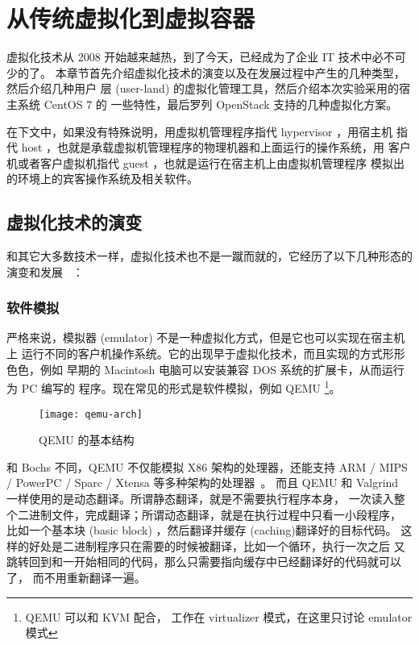 \chapter{从传统虚拟化到虚拟容器}
\label{cha:virtualization-and-container}

虚拟化技术从 2008 开始越来越热，到了今天，已经成为了企业 IT 技术中必不可少的了。
本章节首先介绍虚拟化技术的演变以及在发展过程中产生的几种类型，然后介绍几种用户
层 (user-land) 的虚拟化管理工具，然后介绍本次实验采用的宿主系统 CentOS 7 的
一些特性，最后罗列 OpenStack 支持的几种虚拟化方案。

在下文中，如果没有特殊说明，用虚拟机管理程序指代 hypervisor ，用宿主机
指代 host ，也就是承载虚拟机管理程序的物理机器和上面运行的操作系统，用
客户机或者客户虚拟机指代 guest ，也就是运行在宿主机上由虚拟机管理程序
模拟出的环境上的宾客操作系统及相关软件。

\section{虚拟化技术的演变}

和其它大多数技术一样，虚拟化技术也不是一蹴而就的，它经历了以下几种形态的演变和发展
~\cite{deep-into-kvm}：

\subsection{软件模拟}
\label{emulators}

严格来说，模拟器 (emulator) 不是一种虚拟化方式，但是它也可以实现在宿主机上
运行不同的客户机操作系统。它的出现早于虚拟化技术，而且实现的方式形形色色，例如
早期的 Macintosh 电脑可以安装兼容 DOS 系统的扩展卡，从而运行为 PC 编写的
程序。现在常见的形式是软件模拟，例如 QEMU \footnote{QEMU 可以和 KVM 配合，
工作在 virtualizer 模式，在这里只讨论 emulator 模式}。

\begin{figure}[h]
    \centering
    \texttt{[image: qemu-arch]}
    \caption{QEMU 的基本结构}
\end{figure}

和 Bochs 不同，QEMU 不仅能模拟 X86 架构的处理器，还能支持 ARM / MIPS / PowerPC
 / Sparc / Xtensa 等多种架构的处理器~\cite{qemu-internals}。
而且 QEMU 和 Valgrind 一样使用的是动态翻译。所谓静态翻译，就是不需要执行程序本身，
一次读入整个二进制文件，完成翻译；所谓动态翻译，就是在执行过程中只看一小段程序，
比如一个基本块 (basic block) ，然后翻译并缓存 (caching)翻译好的目标代码。
这样的好处是二进制程序只在需要的时候被翻译，比如一个循环，执行一次之后
又跳转回到和一开始相同的代码，那么只需要指向缓存中已经翻译好的代码就可以了，
而不用重新翻译一遍。

